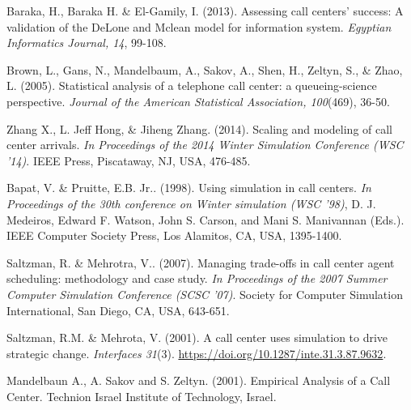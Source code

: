 \documentclass[12pt,twocolumn]{article}
\begin{document}
\newpage
\clearpage
\begin{thebibliography}{7}
Baraka, H., Baraka H. \& El-Gamily, I. (2013). Assessing call centers' success: A validation of the DeLone and Mclean model for information system. \textit{Egyptian Informatics Journal, 14}, 99-108.

Brown, L., Gans, N., Mandelbaum, A., Sakov, A., Shen, H., Zeltyn, S., \& Zhao, L. (2005). Statistical analysis of a telephone call center: a queueing-science perspective. \textit{Journal of the American Statistical Association, 100}(469), 36-50.

Zhang X., L. Jeff Hong, \& Jiheng Zhang. (2014). Scaling and modeling of call center arrivals. \textit{In Proceedings of the 2014 Winter Simulation Conference (WSC '14)}. IEEE Press, Piscataway, NJ, USA, 476-485.

Bapat, V. \& Pruitte, E.B. Jr.. (1998). Using simulation in call centers. \textit{In Proceedings of the 30th conference on Winter simulation (WSC '98)}, D. J. Medeiros, Edward F. Watson, John S. Carson, and Mani S. Manivannan (Eds.). IEEE Computer Society Press, Los Alamitos, CA, USA, 1395-1400.

Saltzman, R. \& Mehrotra, V.. (2007). Managing trade-offs in call center agent scheduling: methodology and case study. \textit{In Proceedings of the 2007 Summer Computer Simulation Conference (SCSC '07)}. Society for Computer Simulation International, San Diego, CA, USA, 643-651.

Saltzman, R.M. \& Mehrota, V. (2001). A call center uses simulation to drive strategic change. \textit{Interfaces 31}(3). \href{https://doi.org/10.1287/inte.31.3.87.9632}{https://doi.org/10.1287/inte.31.3.87.9632}. 

Mandelbaun A., A. Sakov and S. Zeltyn. (2001). Empirical Analysis of a Call Center. Technion Israel Institute of Technology, Israel.

\end{thebibliography}
\end{document}
